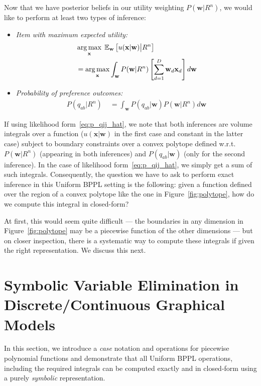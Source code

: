 \documentclass{article} %
\newcommand{\E}{\mathbb{E}}
\renewcommand{\vec}[1]{\mathbf{#1}}
\def\argmax{\operatornamewithlimits{arg\,max}}
\begin{document}
Now that we have posterior beliefs in our utility weighting 
$P(\vec{w}|R^n)$, we would like to perform at least two types of inference:
\begin{itemize}
\item {\it Item with maximum expected utility:} 
\begin{align*}
& \argmax_{\vec{x}} \; \E_{\vec{w}} \left[ u(\vec{x}|\vec{w}) \big| R^n \right]\\ & = \argmax_{\vec{x}} \int_{\vec{w}} P(\vec{w}|R^n) \left[ \sum_{d=1}^{D} \vec{w}_d \vec{x}_d \right] d\vec{w}
\end{align*}
\item {\it Probability of preference outcomes:} 
\begin{align*}
P(q_{ab} | R^n) \; & = \int_\vec{w} P(q_{ab} | \vec{w}) P(\vec{w}|R^n) d\vec{w}
\end{align*}
\end{itemize}
If using likelihood form~\eqref{eq:p_qij_hat}, we note that both
inferences are volume integrals over a function ($u(\vec{x}|\vec{w})$
in the first case and constant in the latter case) subject to boundary
constraints over a convex polytope defined w.r.t.\ $P(\vec{w}|R^n)$
(appearing in both inferences) and $P(q_{ab} | \vec{w})$ (only for the
second inference).  In the case of likelihood
form~\eqref{eq:p_qij_hat}, we simply get a sum of such integrals.
Consequently, the question we have to ask to perform exact inference
in this Uniform BPPL setting is the following: given a function
defined over the region of a convex polytope like the one in
Figure~\ref{fig:polytope}, how do we compute this integral in
closed-form?

At first, this would seem quite difficult --- the boundaries in any
dimension in Figure~\ref{fig:polytope} may be a piecewise function of
the other dimensions --- but on closer inspection, there is a
systematic way to compute these integrals if given the right
representation.  We discuss this next.

\section{Symbolic Variable Elimination in Discrete/Continuous Graphical Models}

In this section, we introduce a \emph{case} notation and operations
for piecewise polynomial functions and demonstrate that all Uniform
BPPL operations, including the required integrals can be computed
exactly and in closed-form using a purely \emph{symbolic}
representation.
\end{document}
